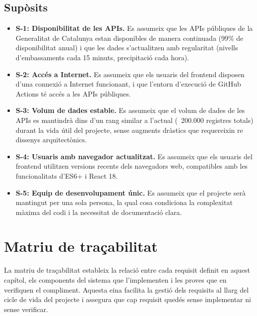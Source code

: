 \subsection{Supòsits}

\begin{itemize}
    \item \textbf{S-1: Disponibilitat de les APIs.} Es assumeix que les APIs públiques de la Generalitat de Catalunya estan disponibles de manera continuada (99\% de disponibilitat anual) i que les dades s'actualitzen amb regularitat (nivells d'embassaments cada 15 minuts, precipitació cada hora).

    \item \textbf{S-2: Accés a Internet.} Es assumeix que els usuaris del frontend disposen d'una connexió a Internet funcionant, i que l'entorn d'execució de GitHub Actions té accés a les APIs públiques.

    \item \textbf{S-3: Volum de dades estable.} Es assumeix que el volum de dades de les APIs es mantindrà dins d'un rang similar a l'actual (~200.000 registres totals) durant la vida útil del projecte, sense augments dràstics que requereixin re dissenys arquitectònics.

    \item \textbf{S-4: Usuaris amb navegador actualitzat.} Es assumeix que els usuaris del frontend utilitzen versions recents dels navegadors web, compatibles amb les funcionalitats d'ES6+ i React 18.

    \item \textbf{S-5: Equip de desenvolupament únic.} Es assumeix que el projecte serà mantingut per una sola persona, la qual cosa condiciona la complexitat màxima del codi i la necessitat de documentació clara.
\end{itemize}


\section{Matriu de traçabilitat}

La matriu de traçabilitat estableix la relació entre cada requisit definit en aquest capítol, els components del sistema que l'implementen i les proves que en verifiquen el compliment. Aquesta eina facilita la gestió dels requisits al llarg del cicle de vida del projecte i assegura que cap requisit quedés sense implementar ni sense verificar.

